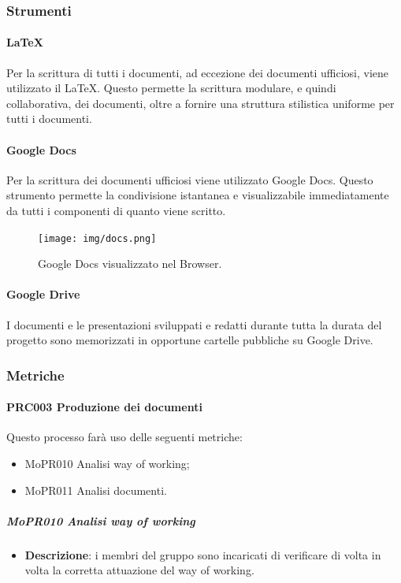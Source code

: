 \documentclass[../norme-di-progetto.tex]{subfiles}
\begin{document}
\subsubsection{Strumenti}
\paragraph{\LaTeX}
Per la scrittura di tutti i documenti, ad eccezione dei documenti ufficiosi, viene utilizzato il  \LaTeX. Questo permette la scrittura modulare, e quindi collaborativa, dei documenti, oltre a fornire una struttura stilistica uniforme per tutti i documenti.

\paragraph{Google Docs}
Per la scrittura dei documenti ufficiosi viene utilizzato Google Docs. Questo strumento permette la condivisione istantanea e visualizzabile immediatamente da tutti i componenti di quanto viene scritto.

\begin{figure}[H]
  \centering
  \texttt{[image: img/docs.png]}
  \label{fig:github}
  \caption{Google Docs visualizzato nel Browser.}
\end{figure}

\paragraph{Google Drive}
I documenti e le presentazioni sviluppati e redatti durante tutta la durata del progetto sono memorizzati in opportune cartelle pubbliche su Google Drive.

\subsubsection{Metriche}
\paragraph{PRC003 Produzione dei documenti}
Questo processo farà uso delle seguenti metriche:
\begin{itemize}
  \item MoPR010 Analisi way of working;
  \item MoPR011 Analisi documenti.
\end{itemize}
\subparagraph{MoPR010 Analisi way of working}
\begin{itemize}
  \item \textbf{Descrizione}: i membri del gruppo sono incaricati di verificare di volta in volta la corretta attuazione del way of working.
\end{itemize}
\end{document}
